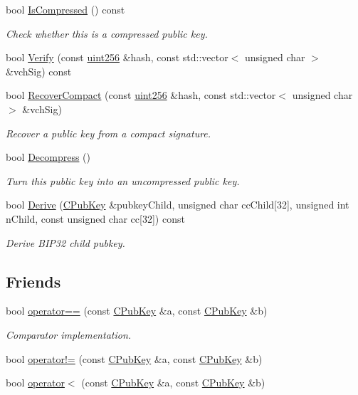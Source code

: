 \begin{DoxyCompactItemize}
bool \hyperlink{class_c_pub_key_a397e437d9d0a008e2641892147b0931a}{Is\+Compressed} () const 
\begin{DoxyCompactList}\small\item\em Check whether this is a compressed public key. \end{DoxyCompactList}\item 
bool \hyperlink{class_c_pub_key_ab4047c7ce31b72591d8108a2563cd21b}{Verify} (const \hyperlink{classuint256}{uint256} \&hash, const std\+::vector$<$ unsigned char $>$ \&vch\+Sig) const 
\item 
bool \hyperlink{class_c_pub_key_a169505e735a02db385486b0affeb565c}{Recover\+Compact} (const \hyperlink{classuint256}{uint256} \&hash, const std\+::vector$<$ unsigned char $>$ \&vch\+Sig)
\begin{DoxyCompactList}\small\item\em Recover a public key from a compact signature. \end{DoxyCompactList}\item 
bool \hyperlink{class_c_pub_key_a572689418fecf47b300a11519bc3da36}{Decompress} ()
\begin{DoxyCompactList}\small\item\em Turn this public key into an uncompressed public key. \end{DoxyCompactList}\item 
bool \hyperlink{class_c_pub_key_a182298237bb189abfe006e2ff3350acc}{Derive} (\hyperlink{class_c_pub_key}{C\+Pub\+Key} \&pubkey\+Child, unsigned char cc\+Child\mbox{[}32\mbox{]}, unsigned int n\+Child, const unsigned char cc\mbox{[}32\mbox{]}) const 
\begin{DoxyCompactList}\small\item\em Derive B\+I\+P32 child pubkey. \end{DoxyCompactList}\end{DoxyCompactItemize}
\subsection*{Friends}
\begin{DoxyCompactItemize}
\item 
bool \hyperlink{class_c_pub_key_a864b3cdcb46fb85c1fc07e0686cc3a31}{operator==} (const \hyperlink{class_c_pub_key}{C\+Pub\+Key} \&a, const \hyperlink{class_c_pub_key}{C\+Pub\+Key} \&b)
\begin{DoxyCompactList}\small\item\em Comparator implementation. \end{DoxyCompactList}\item 
bool \hyperlink{class_c_pub_key_af660fd5a8d213211dfff37a2296d09e1}{operator!=} (const \hyperlink{class_c_pub_key}{C\+Pub\+Key} \&a, const \hyperlink{class_c_pub_key}{C\+Pub\+Key} \&b)
\item 
bool \hyperlink{class_c_pub_key_af814095b2c92bedd96a83a0811d52da9}{operator$<$} (const \hyperlink{class_c_pub_key}{C\+Pub\+Key} \&a, const \hyperlink{class_c_pub_key}{C\+Pub\+Key} \&b)
\end{DoxyCompactItemize}


